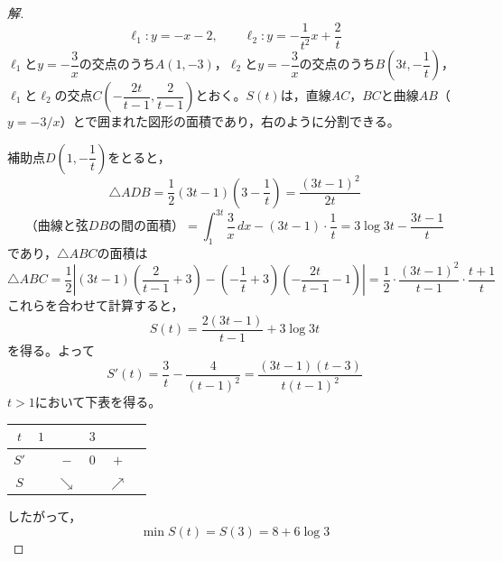 \documentclass[../main.tex]{subfiles}
\begin{document}
\begin{proof}[解]
  \[
    \ell_1: y=-x-2, \qquad \ell_2: y=-\frac{1}{t^2}x+\frac{2}{t}
  \]
  $\ell_1$と$y=-\dfrac3x$の交点のうち$A(1,-3)$，$\ell_2$と$y=-\dfrac3x$の交点のうち$B\left(3t,-\dfrac1t\right)$，$\ell_1$と$\ell_2$の交点$C\left(-\dfrac{2t}{t-1},\dfrac{2}{t-1}\right)$とおく。$S(t)$は，直線$AC$，$BC$と曲線$AB$（$y=-3/x$）とで囲まれた図形の面積であり，右のように分割できる。

  \begin{center}
  \end{center}

  補助点$D\left(1,-\dfrac1t\right)$をとると，
  \[
    \triangle ADB=\frac12(3t-1)\left(3-\frac1t\right)=\frac{(3t-1)^2}{2t}
  \]
  \[
    \text{（曲線と弦}DB\text{の間の面積）}=\int_1^{3t}\frac3x\,dx-(3t-1)\cdot\frac1t=3\log3t-\frac{3t-1}{t}
  \]
  であり，$\triangle ABC$の面積は
  \[
    \triangle ABC=\frac12\left|(3t-1)\left(\frac{2}{t-1}+3\right)-\left(-\frac1t+3\right)\left(-\frac{2t}{t-1}-1\right)\right|=\frac12\cdot\frac{(3t-1)^2}{t-1}\cdot\frac{t+1}{t}
  \]
  これらを合わせて計算すると，
  \[
    S(t)=\frac{2(3t-1)}{t-1}+3\log3t
  \]
  を得る。よって
  \[
    S'(t)=\frac3t-\frac{4}{(t-1)^2}=\frac{(3t-1)(t-3)}{t(t-1)^2}
  \]
  $t>1$において下表を得る。
  \begin{center}
    \begin{tabular}{c|ccccc}
      $t$ & $1$ & & $3$ & & \\
      \hline
      $S'$ & & $-$ & $0$ & $+$ & \\
      \hline
      $S$ & & $\searrow$ & & $\nearrow$ &
    \end{tabular}
  \end{center}
  したがって，
  \[
    \min S(t)=S(3)=8+6\log3
  \]
\end{proof}
\end{document}
